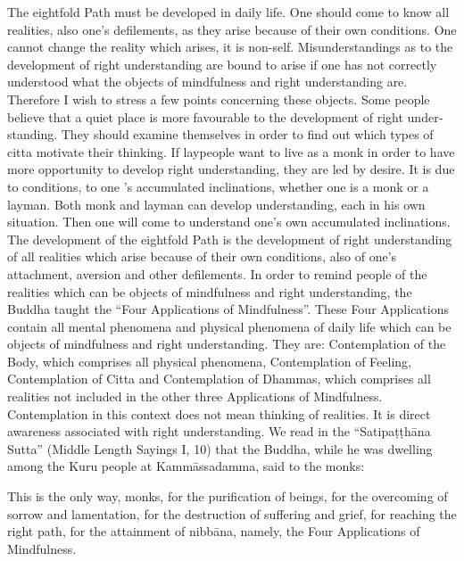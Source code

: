 \documentclass{book}
\begin{document}
The eightfold Path must be developed in daily life. One should come to
know all realities, also one's defilements, as they arise because of
their own conditions. One cannot change the reality which arises, it is
non-self. Misunder­standings as to the development of right
understanding are bound to arise if one has not correctly understood
what the objects of mindfulness and right understanding are. Therefore I
wish to stress a few points concerning these objects. Some people
believe that a quiet place is more favourable to the development of
right under­standing. They should examine themselves in order to find
out which types of citta motivate their thinking. If laypeople want to
live as a monk in order to have more opportunity to develop right
understanding, they are led by desire. It is due to conditions, to one
's accumulated inclinations, whether one is a monk or a layman. Both
monk and layman can develop understanding, each in his own situation.
Then one will come to understand one's own accumulated inclinations. The
development of the eightfold Path is the development of right
understanding of all realities which arise because of their own
conditions, also of one's attachment, aversion and other defilements. In
order to remind people of the realities which can be objects of
mindfulness and right understanding, the Buddha taught the ``Four
Applications of Mindfulness''. These Four Applications contain all
mental phenomena and physical phenomena of daily life which can be
objects of mindfulness and right understanding. They are: Contem­plation
of the Body, which comprises all physical phenomena, Contemplation of
Feeling, Contemplation of Citta and Contemplation of Dhammas, which
comprises all realities not included in the other three Applications of
Mindfulness. Contemplation in this context does not mean thinking of
realities. It is direct awareness associated with right understanding.
We read in the ``Satipaṭṭhāna Sutta'' (Middle Length Sayings I, 10) that
the Buddha, while he was dwelling among the Kuru people at
Kammāssadamma, said to the monks:

This is the only way, monks, for the purification of beings, for the
overcoming of sorrow and lamentation, for the destruction of suffering
and grief, for reaching the right path, for the attainment of nibbāna,
namely, the Four Applications of Mindfulness.
\end{document}
